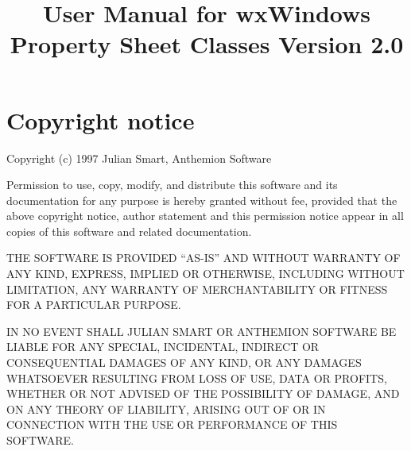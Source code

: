 
\parskip=10pt
\parindent=0pt
\title{User Manual for wxWindows Property Sheet Classes Version 2.0}
\makeindex

\maketitle
\pagestyle{fancyplain}

\setfooter{\thepage}{}{}{}{}{\thepage}%
\tableofcontents

\chapter*{Copyright notice}
%
\setfooter{\thepage}{}{}{}{}{\thepage}%

\begin{center}
Copyright (c) 1997 Julian Smart, Anthemion Software
\end{center}

Permission to use, copy, modify, and distribute this software and its
documentation for any purpose is hereby granted without fee, provided that the
above copyright notice, author statement and this permission notice appear in
all copies of this software and related documentation.

THE SOFTWARE IS PROVIDED ``AS-IS'' AND WITHOUT WARRANTY OF ANY KIND, EXPRESS,
IMPLIED OR OTHERWISE, INCLUDING WITHOUT LIMITATION, ANY WARRANTY OF
MERCHANTABILITY OR FITNESS FOR A PARTICULAR PURPOSE.

IN NO EVENT SHALL JULIAN SMART OR ANTHEMION SOFTWARE BE LIABLE FOR ANY SPECIAL,
INCIDENTAL, INDIRECT OR CONSEQUENTIAL DAMAGES OF ANY KIND, OR ANY DAMAGES
WHATSOEVER RESULTING FROM LOSS OF USE, DATA OR PROFITS, WHETHER OR NOT ADVISED
OF THE POSSIBILITY OF DAMAGE, AND ON ANY THEORY OF LIABILITY, ARISING OUT OF
OR IN CONNECTION WITH THE USE OR PERFORMANCE OF THIS SOFTWARE.





\newpage

%
\setfooter{\thepage}{}{}{}{}{\thepage}%
\printindex

